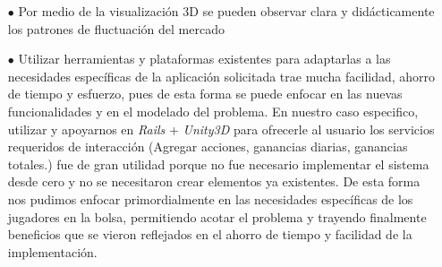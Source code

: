 \begin{itemize}
\item[$\bullet$] Por medio de la visualización 3D se pueden observar clara y didácticamente los patrones de fluctuación del mercado	

\item[$\bullet$] Utilizar herramientas y plataformas existentes para adaptarlas a las necesidades específicas de la aplicación solicitada trae mucha facilidad, ahorro de tiempo y esfuerzo, pues de esta forma se puede enfocar en las nuevas funcionalidades y en el modelado del problema. En nuestro caso especifico, utilizar y apoyarnos en \emph{Rails} + \emph{Unity3D} para ofrecerle al usuario los servicios requeridos de interacción (Agregar acciones, ganancias diarias, ganancias totales.) fue de gran utilidad porque no fue necesario implementar el sistema desde cero y no se necesitaron crear elementos ya existentes. De esta forma nos pudimos enfocar primordialmente en las necesidades específicas de los jugadores en la bolsa, permitiendo acotar el problema y trayendo finalmente beneficios que se vieron reflejados en el ahorro de tiempo y facilidad de la implementación.	
	
\end{itemize}
